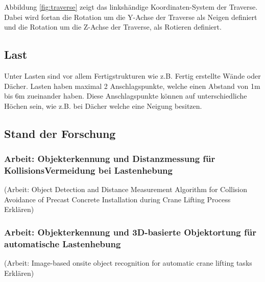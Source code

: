 Abbildung \ref{fig:traverse} zeigt das linkshändige Koordinaten-System der Traverse. Dabei wird fortan die Rotation um die Y-Achse der Traverse als Neigen definiert und die Rotation um die Z-Achse der Traverse, als Rotieren definiert.

\subsection{Last}
Unter Lasten sind vor allem Fertigstrukturen wie z.B. Fertig erstellte Wände oder Dächer. Lasten haben maximal 2 Anschlagspunkte, welche einen Abstand von 1m bis 6m zueinander haben. Diese Anschlagspunkte können auf unterschiedliche Höchen sein, wie z.B. bei Dächer welche eine Neigung besitzen.


\subsection{Stand der Forschung}

\subsubsection{Arbeit: Objekterkennung und Distanzmessung für KollisionsVermeidung bei Lastenhebung}
(Arbeit: Object Detection and Distance Measurement Algorithm for Collision Avoidance of Precast Concrete Installation during Crane Lifting Process\cite{yong_object_2023} Erklären)

\subsubsection{Arbeit: Objekterkennung und 3D-basierte Objektortung für automatische Lastenhebung}
(Arbeit: Image-based onsite object recognition for automatic crane lifting tasks\cite{zhou_image-based_2021} Erklären)





